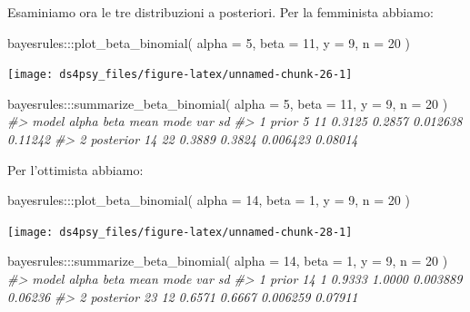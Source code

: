 \documentclass[
  11pt,
]{krantz}
\makeatletter
\newenvironment{Shaded}{\begin{snugshade}}{\end{snugshade}}
\newcommand{\AttributeTok}[1]{\textcolor[rgb]{0.61,0.61,0.61}{#1}}
\newcommand{\CommentTok}[1]{\textcolor[rgb]{0.37,0.37,0.37}{\textit{#1}}}
\newcommand{\DecValTok}[1]{\textcolor[rgb]{0.06,0.06,0.06}{#1}}
\newcommand{\FunctionTok}[1]{\textcolor[rgb]{0,0,0}{#1}}
\newcommand{\NormalTok}[1]{#1}
\newcommand{\SpecialCharTok}[1]{\textcolor[rgb]{0,0,0}{#1}}
\newenvironment{kframe}{%
\medskip{}
\setlength{\fboxsep}{.8em}
 \def\at@end@of@kframe{}%
 \ifinner\ifhmode%
  \def\at@end@of@kframe{\end{minipage}}%
  \begin{minipage}{\columnwidth}%
 \fi\fi%
 \def\FrameCommand##1{\hskip\@totalleftmargin \hskip-\fboxsep
 \colorbox{shadecolor}{##1}\hskip-\fboxsep
     \hskip-\linewidth \hskip-\@totalleftmargin \hskip\columnwidth}%
 \MakeFramed {\advance\hsize-\width
   \@totalleftmargin\z@ \linewidth\hsize
   \@setminipage}}%
 {\par\unskip\endMakeFramed%
 \at@end@of@kframe}
\renewenvironment{Shaded}{\begin{kframe}}{\end{kframe}}
\theoremstyle{definition}
\theoremstyle{definition}
\theoremstyle{definition}
\theoremstyle{definition}
\theoremstyle{remark}
\makeatother
\begin{document}
Esaminiamo ora le tre distribuzioni a posteriori. Per la femminista abbiamo:

\begin{Shaded}
\begin{Highlighting}[]
\NormalTok{bayesrules}\SpecialCharTok{:::}\FunctionTok{plot\_beta\_binomial}\NormalTok{(}
  \AttributeTok{alpha =} \DecValTok{5}\NormalTok{, }\AttributeTok{beta =} \DecValTok{11}\NormalTok{, }\AttributeTok{y =} \DecValTok{9}\NormalTok{, }\AttributeTok{n =} \DecValTok{20}
\NormalTok{  ) }
\end{Highlighting}
\end{Shaded}

\begin{center}\texttt{[image: ds4psy\_files/figure-latex/unnamed-chunk-26-1]} \end{center}

\begin{Shaded}
\begin{Highlighting}[]
\NormalTok{bayesrules}\SpecialCharTok{:::}\FunctionTok{summarize\_beta\_binomial}\NormalTok{(}
  \AttributeTok{alpha =} \DecValTok{5}\NormalTok{, }\AttributeTok{beta =} \DecValTok{11}\NormalTok{, }\AttributeTok{y =} \DecValTok{9}\NormalTok{, }\AttributeTok{n =} \DecValTok{20}
\NormalTok{)}
\CommentTok{\#\textgreater{}       model alpha beta   mean   mode      var      sd}
\CommentTok{\#\textgreater{} 1     prior     5   11 0.3125 0.2857 0.012638 0.11242}
\CommentTok{\#\textgreater{} 2 posterior    14   22 0.3889 0.3824 0.006423 0.08014}
\end{Highlighting}
\end{Shaded}

Per l'ottimista abbiamo:

\begin{Shaded}
\begin{Highlighting}[]
\NormalTok{bayesrules}\SpecialCharTok{:::}\FunctionTok{plot\_beta\_binomial}\NormalTok{(}
  \AttributeTok{alpha =} \DecValTok{14}\NormalTok{, }\AttributeTok{beta =} \DecValTok{1}\NormalTok{, }\AttributeTok{y =} \DecValTok{9}\NormalTok{, }\AttributeTok{n =} \DecValTok{20}
\NormalTok{) }
\end{Highlighting}
\end{Shaded}

\begin{center}\texttt{[image: ds4psy\_files/figure-latex/unnamed-chunk-28-1]} \end{center}

\begin{Shaded}
\begin{Highlighting}[]
\NormalTok{bayesrules}\SpecialCharTok{:::}\FunctionTok{summarize\_beta\_binomial}\NormalTok{(}
  \AttributeTok{alpha =} \DecValTok{14}\NormalTok{, }\AttributeTok{beta =} \DecValTok{1}\NormalTok{, }\AttributeTok{y =} \DecValTok{9}\NormalTok{, }\AttributeTok{n =} \DecValTok{20}
\NormalTok{)}
\CommentTok{\#\textgreater{}       model alpha beta   mean   mode      var      sd}
\CommentTok{\#\textgreater{} 1     prior    14    1 0.9333 1.0000 0.003889 0.06236}
\CommentTok{\#\textgreater{} 2 posterior    23   12 0.6571 0.6667 0.006259 0.07911}
\end{Highlighting}
\end{Shaded}
\end{document}
